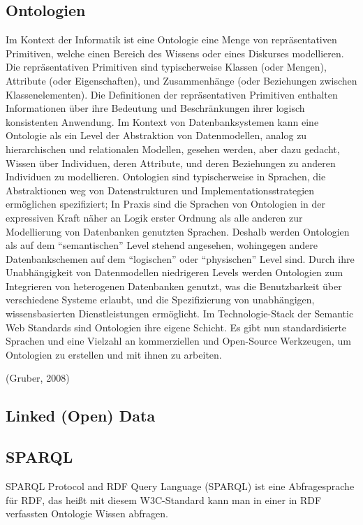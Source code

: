 \subsection{Ontologien}
\begin{definition}[Ontologie]
Im Kontext der Informatik ist eine Ontologie eine Menge von repräsentativen Primitiven, welche einen Bereich des Wissens oder eines Diskurses modellieren.
Die repräsentativen Primitiven sind typischerweise Klassen (oder Mengen), Attribute (oder Eigenschaften), und Zusammenhänge (oder Beziehungen zwischen Klassenelementen).
Die Definitionen der repräsentativen Primitiven enthalten Informationen über ihre Bedeutung und Beschränkungen ihrer logisch konsistenten Anwendung.
Im Kontext von Datenbanksystemen kann eine Ontologie als ein Level der Abstraktion von Datenmodellen, analog zu hierarchischen und relationalen Modellen, gesehen werden, aber dazu gedacht, Wissen über Individuen, deren Attribute, und deren Beziehungen zu anderen Individuen zu modellieren.
Ontologien sind typischerweise in Sprachen, die Abstraktionen weg von Datenstrukturen und Implementationsstrategien ermöglichen spezifiziert;
In Praxis sind die Sprachen von Ontologien in der expressiven Kraft näher an Logik erster Ordnung als alle anderen zur Modellierung von Datenbanken genutzten Sprachen.
Deshalb werden Ontologien als auf dem \enquote{semantischen} Level stehend angesehen, wohingegen andere Datenbankschemen auf dem \enquote{logischen} oder \enquote{physischen} Level sind.
Durch ihre Unabhängigkeit von Datenmodellen niedrigeren Levels werden Ontologien zum Integrieren von heterogenen Datenbanken genutzt, was die Benutzbarkeit über verschiedene Systeme erlaubt, und die Spezifizierung von unabhängigen, wissensbasierten  Dienstleistungen ermöglicht.
Im Technologie-Stack der Semantic Web Standards sind Ontologien ihre eigene Schicht.
Es gibt nun standardisierte Sprachen und eine Vielzahl an kommerziellen und Open-Source Werkzeugen, um Ontologien zu erstellen und mit ihnen zu arbeiten.
\end{definition} (Gruber, 2008)
\subsection{Linked (Open) Data}

\subsection{SPARQL}

SPARQL Protocol and RDF Query Language (SPARQL) ist eine Abfragesprache für RDF, das heißt mit diesem W3C-Standard kann man in einer in RDF verfassten Ontologie Wissen abfragen.

